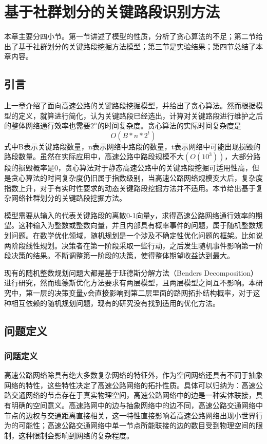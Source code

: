 
\chapter{基于社群划分的关键路段识别方法}
	本章主要分四小节。第一节讲述了模型的性质，分析了贪心算法的不足；第二节给出了基于社群划分的关键路段挖掘方法模型；第三节是实验结果；第四节总结了本章内容。
	\section{引言}
		上一章介绍了面向高速公路的关键路段挖掘模型，并给出了贪心算法。然而根据模型的定义，就算进行简化，认为关键路段已经选出，计算对关键路段进行维护之后的整体网络通行效率也需要$2^n$的时间复杂度。贪心算法的实际时间复杂度是
		$$O(B*n*2^t)$$
		式中B表示关键路段数量，n表示网络中路段的数量，t表示网络中可能出现损毁的路段数量。虽然在实际应用中，高速公路中路段规模不大$(O(10^3))$，大部分路段的损毁概率是0，贪心算法对于静态高速公路中的关键路段挖掘可适用性高，但是贪心算法的时间复杂度仍旧属于指数级别，当高速公路网络规模变大后，复杂度指数上升，对于有实时性要求的动态关键路段挖掘方法并不适用。本节给出基于复杂网络社群划分的关键路段挖掘方法。

		模型需要从输入的代表关键路段的离散0-1向量$\bm{y}$，求得高速公路网络通行效率的期望。这种输入为整数或整数向量，并且内部具有概率事件的问题，属于随机整数规划问题。在数学优化领域，随机规划是一个涉及不确定性优化问题的框架。比如说两阶段线性规划。决策者在第一阶段采取一些行动，之后发生随机事件影响第一阶段决策的结果。不断调整第一阶段的决策，使得整体期望收益达到最大。

		现有的随机整数规划问题大都是基于班德斯分解方法（Benders Decomposition）进行研究，然而班德斯优化方法要求有两层模型，且两层模型之间互不影响。本研究中，第一层的决策变量$\bm{y}$会直接影响到第二层里面的路网拓扑结构概率，对于这种相互依赖的随机规划问题，现有的研究没有找到适用的优化方法。

	\section{问题定义}


		\subsection{问题定义}

			高速公路网络除具有绝大多数复杂网络的特征外，作为空间网络还具有不同于抽象网络的特性，这些特性决定了高速公路网络的拓扑性质。具体可以归纳为：高速公路交通网络的节点存在于真实物理空间，高速公路网络中的边是一种实体联接，具有明确的空间意义。高速路网中的边与抽象网络中的边不同，高速公路交通网络中节点的边权与交通距离直接相关，这一特性直接影响着高速公路网络出现小世界行为的可能性\parencite{ysk2017qx}；高速公路交通网络中单一节点所能联接的边的数目受到物理空间的限制，这种限制会影响到网络的复杂程度。


